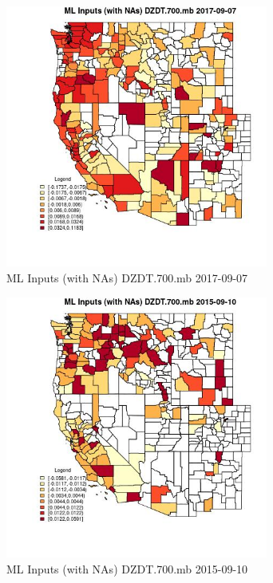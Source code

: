 \begin{figure} 
\centering  
\includegraphics[width=0.77\textwidth]{Code_Outputs/Report_ML_input_PM25_Step4_part_e_de_duplicated_aves_compiled_2019-05-21wNAs_CountyDZDT700mbMean2017-09-07.jpg} 
\caption{\label{fig:Report_ML_input_PM25_Step4_part_e_de_duplicated_aves_compiled_2019-05-21wNAsCountyDZDT700mbMean2017-09-07}ML Inputs (with NAs) DZDT.700.mb 2017-09-07} 
\end{figure} 
 

\begin{figure} 
\centering  
\includegraphics[width=0.77\textwidth]{Code_Outputs/Report_ML_input_PM25_Step4_part_e_de_duplicated_aves_compiled_2019-05-21wNAs_CountyDZDT700mbMean2015-09-10.jpg} 
\caption{\label{fig:Report_ML_input_PM25_Step4_part_e_de_duplicated_aves_compiled_2019-05-21wNAsCountyDZDT700mbMean2015-09-10}ML Inputs (with NAs) DZDT.700.mb 2015-09-10} 
\end{figure} 
 

